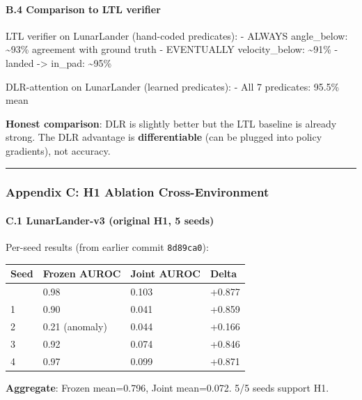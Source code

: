 \documentclass[
]{article}
\newcounter{none} %
\begin{document}
\paragraph{B.4 Comparison to LTL
verifier}\label{b.4-comparison-to-ltl-verifier}

LTL verifier on LunarLander (hand-coded predicates): - ALWAYS
angle\_below: \textasciitilde93\% agreement with ground truth -
EVENTUALLY velocity\_below: \textasciitilde91\% - landed -\textgreater{}
in\_pad: \textasciitilde95\%

DLR-attention on LunarLander (learned predicates): - All 7 predicates:
95.5\% mean

\textbf{Honest comparison}: DLR is slightly better but the LTL baseline
is already strong. The DLR advantage is \textbf{differentiable} (can be
plugged into policy gradients), not accuracy.

\begin{center}\rule{0.5\linewidth}{0.5pt}\end{center}

\subsubsection{Appendix C: H1 Ablation
Cross-Environment}\label{appendix-c-h1-ablation-cross-environment}

\paragraph{C.1 LunarLander-v3 (original H1, 5
seeds)}\label{c.1-lunarlander-v3-original-h1-5-seeds}

Per-seed results (from earlier commit \texttt{8d89ca0}):

{\def\LTcaptype{none} %
\begin{longtable}[]{@{}llll@{}}
\toprule\noalign{}
Seed & Frozen AUROC & Joint AUROC & Delta \\
\midrule\noalign{}
\endhead
\bottomrule\noalign{}
\endlastfoot
0 & 0.98 & 0.103 & +0.877 \\
1 & 0.90 & 0.041 & +0.859 \\
2 & 0.21 (anomaly) & 0.044 & +0.166 \\
3 & 0.92 & 0.074 & +0.846 \\
4 & 0.97 & 0.099 & +0.871 \\
\end{longtable}
}

\textbf{Aggregate}: Frozen mean=0.796, Joint mean=0.072. 5/5 seeds
support H1.
\end{document}
